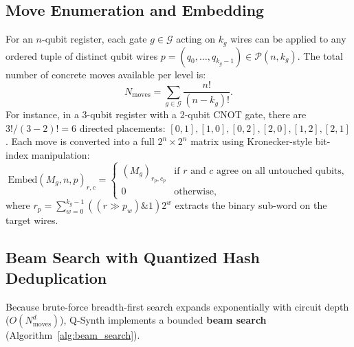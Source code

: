 \documentclass[11pt]{article}
\begin{document}
\subsection{Move Enumeration and Embedding}
For an $n$-qubit register, each gate $g \in \mathcal{G}$ acting on $k_g$ wires can be applied to any ordered tuple of distinct qubit wires $p = (q_0, \dots, q_{k_g-1}) \in \mathcal{P}(n, k_g)$. The total number of concrete moves available per level is:
\begin{equation}
    N_{\text{moves}} = \sum_{g \in \mathcal{G}} \frac{n!}{(n - k_g)!}.
\end{equation}
For instance, in a 3-qubit register with a 2-qubit CNOT gate, there are $3! / (3-2)! = 6$ directed placements: $[0,1], [1,0], [0,2], [2,0], [1,2], [2,1]$. Each move is converted into a full $2^n \times 2^n$ matrix using Kronecker-style bit-index manipulation:
\begin{equation}
    \mathrm{Embed}(M_g, n, p)_{r, c} =
    \begin{cases}
        (M_g)_{r_p, c_p} & \text{if } r \text{ and } c \text{ agree on all untouched qubits}, \\
        0 & \text{otherwise},
    \end{cases}
\end{equation}
where $r_p = \sum_{w=0}^{k_g-1} ((r \gg p_w) \& 1) 2^w$ extracts the binary sub-word on the target wires.

\subsection{Beam Search with Quantized Hash Deduplication}
Because brute-force breadth-first search expands exponentially with circuit depth ($O(N_{\text{moves}}^d)$), Q-Synth implements a bounded \textbf{beam search} (Algorithm~\ref{alg:beam_search}).
\end{document}
